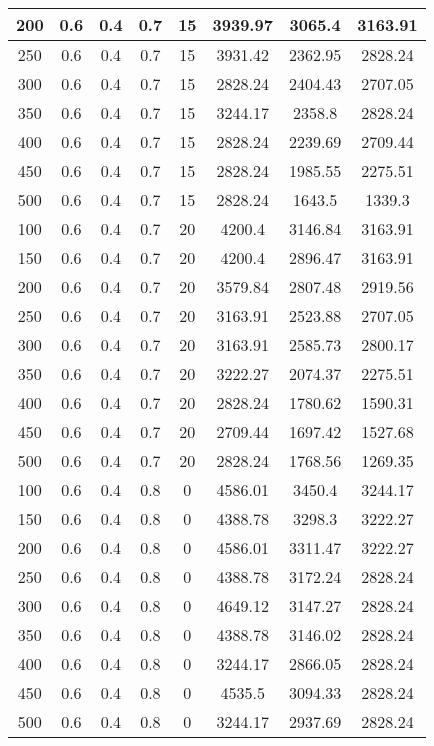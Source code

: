 \documentclass[a4paper, 12pt]{extreport}
\begin{document}
\begin{itemize}
\begin{longtable}{|c|c|c|c|c|c|c|c|}
			200 & 0.6 & 0.4 & 0.7 & 15 & 3939.97 & 3065.4 & 3163.91 \\\hline
			250 & 0.6 & 0.4 & 0.7 & 15 & 3931.42 & 2362.95 & 2828.24 \\\hline
			300 & 0.6 & 0.4 & 0.7 & 15 & 2828.24 & 2404.43 & 2707.05 \\\hline
			350 & 0.6 & 0.4 & 0.7 & 15 & 3244.17 & 2358.8 & 2828.24 \\\hline
			400 & 0.6 & 0.4 & 0.7 & 15 & 2828.24 & 2239.69 & 2709.44 \\\hline
			450 & 0.6 & 0.4 & 0.7 & 15 & 2828.24 & 1985.55 & 2275.51 \\\hline
			500 & 0.6 & 0.4 & 0.7 & 15 & 2828.24 & 1643.5 & 1339.3 \\\hline
			100 & 0.6 & 0.4 & 0.7 & 20 & 4200.4 & 3146.84 & 3163.91 \\\hline
			150 & 0.6 & 0.4 & 0.7 & 20 & 4200.4 & 2896.47 & 3163.91 \\\hline
			200 & 0.6 & 0.4 & 0.7 & 20 & 3579.84 & 2807.48 & 2919.56 \\\hline
			250 & 0.6 & 0.4 & 0.7 & 20 & 3163.91 & 2523.88 & 2707.05 \\\hline
			300 & 0.6 & 0.4 & 0.7 & 20 & 3163.91 & 2585.73 & 2800.17 \\\hline
			350 & 0.6 & 0.4 & 0.7 & 20 & 3222.27 & 2074.37 & 2275.51 \\\hline
			400 & 0.6 & 0.4 & 0.7 & 20 & 2828.24 & 1780.62 & 1590.31 \\\hline
			450 & 0.6 & 0.4 & 0.7 & 20 & 2709.44 & 1697.42 & 1527.68 \\\hline
			500 & 0.6 & 0.4 & 0.7 & 20 & 2828.24 & 1768.56 & 1269.35 \\\hline
			100 & 0.6 & 0.4 & 0.8 & 0 & 4586.01 & 3450.4 & 3244.17 \\\hline
			150 & 0.6 & 0.4 & 0.8 & 0 & 4388.78 & 3298.3 & 3222.27 \\\hline
			200 & 0.6 & 0.4 & 0.8 & 0 & 4586.01 & 3311.47 & 3222.27 \\\hline
			250 & 0.6 & 0.4 & 0.8 & 0 & 4388.78 & 3172.24 & 2828.24 \\\hline
			300 & 0.6 & 0.4 & 0.8 & 0 & 4649.12 & 3147.27 & 2828.24 \\\hline
			350 & 0.6 & 0.4 & 0.8 & 0 & 4388.78 & 3146.02 & 2828.24 \\\hline
			400 & 0.6 & 0.4 & 0.8 & 0 & 3244.17 & 2866.05 & 2828.24 \\\hline
			450 & 0.6 & 0.4 & 0.8 & 0 & 4535.5 & 3094.33 & 2828.24 \\\hline
			500 & 0.6 & 0.4 & 0.8 & 0 & 3244.17 & 2937.69 & 2828.24 \\\hline

\end{longtable}
\end{itemize}
\end{document}
